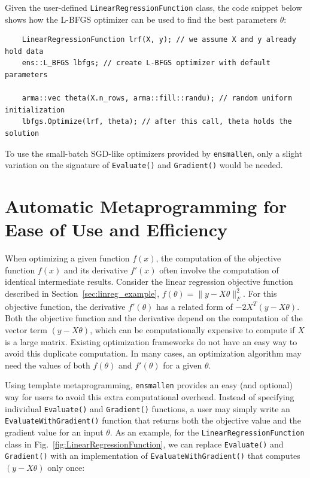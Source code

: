 \documentclass{article}
\begin{document}
Given the user-defined {\tt LinearRegressionFunction} class,
the code snippet below
shows how the L-BFGS optimizer can be used to find the best parameters $\theta$:

\vspace*{-0.4em}
\begin{verbatim}
    LinearRegressionFunction lrf(X, y); // we assume X and y already hold data
    ens::L_BFGS lbfgs; // create L-BFGS optimizer with default parameters

    arma::vec theta(X.n_rows, arma::fill::randu); // random uniform initialization
    lbfgs.Optimize(lrf, theta); // after this call, theta holds the solution
\end{verbatim}
\vspace*{-0.4em}

To use the small-batch SGD-like optimizers provided by {\tt ensmallen},
only a slight variation on the signature of \texttt{\small Evaluate()} and
\texttt{\small Gradient()} would be needed.

\vspace*{-0.3em}
\section{Automatic Metaprogramming for Ease of Use and Efficiency}
\vspace*{-0.5em}

When optimizing a given function $f(x)$, the computation of
the objective function $f(x)$ and its derivative $f'(x)$ often involve the
computation of identical intermediate results.  Consider the linear regression
objective function described
in Section~\ref{sec:linreg_example}, {\small $f(\theta) = \| y - X\theta \|_F^2$}.
For this objective function, the derivative $f'(\theta)$ has a related form of
{\small $-2 X^T (y -X \theta)$}.  Both the objective function and the derivative 
depend on the computation of the vector term {\small $(y - X \theta)$},
which can be computationally expensive to compute if $X$ is a large matrix.
Existing optimization frameworks do not have an easy way to avoid
this duplicate computation. In many cases, an optimization algorithm
may need the values of both $f(\theta)$ and $f'(\theta)$ for a given $\theta$.

Using template metaprogramming, {\tt ensmallen} provides an easy (and
optional) way for users to avoid this extra computational overhead.  Instead of
specifying individual \texttt{\small Evaluate()} and \texttt{\small Gradient()} functions, a user
may simply write an \texttt{\small EvaluateWithGradient()} function that returns both the
objective value and the gradient value for an input $\theta$.  As an example,
for the 
\texttt{LinearRegressionFunction} class in Fig.~\ref{fig:LinearRegressionFunction},
we can replace \texttt{\small Evaluate()} and \texttt{\small Gradient()}
with an implementation of \texttt{\small EvaluateWithGradient()}
that computes {\small $(y - X \theta)$} only once:
\end{document}
